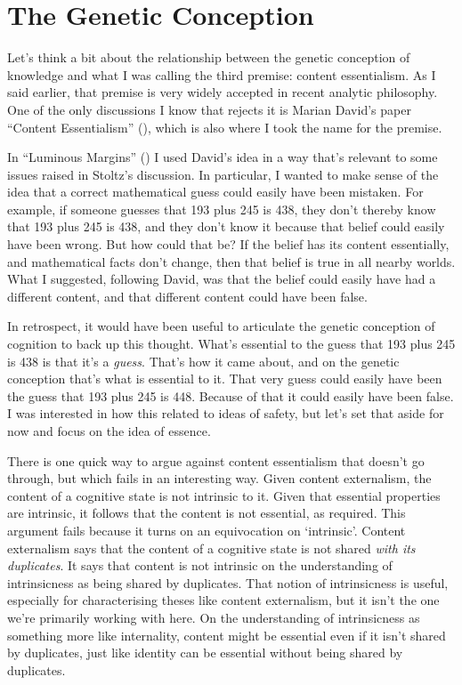 \documentclass[
  11pt,
  letterpaper,
  DIV=11,
  numbers=noendperiod,
  twoside]{scrartcl}
\begin{document}
\section{The Genetic Conception}\label{sec-genetic}

Let's think a bit about the relationship between the genetic conception
of knowledge and what I was calling the third premise: content
essentialism. As I said earlier, that premise is very widely accepted in
recent analytic philosophy. One of the only discussions I know that
rejects it is Marian David's paper ``Content Essentialism''
(), which is also where I took the
name for the premise.

In ``Luminous Margins'' () I used David's idea in a way that's relevant to some issues
raised in Stoltz's discussion. In particular, I wanted to make sense of
the idea that a correct mathematical guess could easily have been
mistaken. For example, if someone guesses that 193 plus 245 is 438, they
don't thereby know that 193 plus 245 is 438, and they don't know it
because that belief could easily have been wrong. But how could that be?
If the belief has its content essentially, and mathematical facts don't
change, then that belief is true in all nearby worlds. What I suggested,
following David, was that the belief could easily have had a different
content, and that different content could have been false.

In retrospect, it would have been useful to articulate the genetic
conception of cognition to back up this thought. What's essential to the
guess that 193 plus 245 is 438 is that it's a \emph{guess}. That's how
it came about, and on the genetic conception that's what is essential to
it. That very guess could easily have been the guess that 193 plus 245
is 448. Because of that it could easily have been false. I was
interested in how this related to ideas of safety, but let's set that
aside for now and focus on the idea of essence.

There is one quick way to argue against content essentialism that
doesn't go through, but which fails in an interesting way. Given content
externalism, the content of a cognitive state is not intrinsic to it.
Given that essential properties are intrinsic, it follows that the
content is not essential, as required. This argument fails because it
turns on an equivocation on `intrinsic'. Content externalism says that
the content of a cognitive state is not shared \emph{with its
duplicates}. It says that content is not intrinsic on the understanding
of intrinsicness as being shared by duplicates. That notion of
intrinsicness is useful, especially for characterising theses like
content externalism, but it isn't the one we're primarily working with
here. On the understanding of intrinsicness as something more like
internality, content might be essential even if it isn't shared by
duplicates, just like identity can be essential without being shared by
duplicates.
\end{document}
